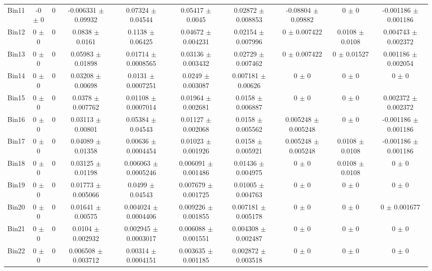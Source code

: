 \begin{tabular}{@{\extracolsep{4pt}}lccccccccc@{}}
     Bin11 & -0 $\pm$ 0 & 0 & -0.006331 $\pm$ 0.09932 & 0.07324 $\pm$ 0.04544 & 0.05417 $\pm$ 0.0045 & 0.02872 $\pm$ 0.008853 & -0.08804 $\pm$ 0.09882 & 0 $\pm$ 0 & -0.001186 $\pm$ 0.001186 \\ 
     Bin12 & 0 $\pm$ 0 & 0 & 0.0838 $\pm$ 0.0161 & 0.1138 $\pm$ 0.06425 & 0.04672 $\pm$ 0.004231 & 0.02154 $\pm$ 0.007996 & 0 $\pm$ 0.007422 & 0.0108 $\pm$ 0.0108 & 0.004743 $\pm$ 0.002372 \\ 
     Bin13 & 0 $\pm$ 0 & 0 & 0.05983 $\pm$ 0.01898 & 0.01714 $\pm$ 0.0008565 & 0.03136 $\pm$ 0.003432 & 0.02729 $\pm$ 0.007462 & 0 $\pm$ 0.007422 & 0 $\pm$ 0.01527 & 0.001186 $\pm$ 0.002054 \\ 
     Bin14 & 0 $\pm$ 0 & 0 & 0.03208 $\pm$ 0.00698 & 0.0131 $\pm$ 0.0007251 & 0.0249 $\pm$ 0.003087 & 0.007181 $\pm$ 0.00626 & 0 $\pm$ 0 & 0 $\pm$ 0 & 0 $\pm$ 0 \\ 
     Bin15 & 0 $\pm$ 0 & 0 & 0.0378 $\pm$ 0.007762 & 0.01108 $\pm$ 0.0007014 & 0.01964 $\pm$ 0.002681 & 0.0158 $\pm$ 0.006887 & 0 $\pm$ 0 & 0 $\pm$ 0 & 0.002372 $\pm$ 0.002372 \\ 
     Bin16 & 0 $\pm$ 0 & 0 & 0.03113 $\pm$ 0.00801 & 0.05384 $\pm$ 0.04543 & 0.01127 $\pm$ 0.002068 & 0.0158 $\pm$ 0.005562 & 0.005248 $\pm$ 0.005248 & 0 $\pm$ 0 & -0.001186 $\pm$ 0.001186 \\ 
     Bin17 & 0 $\pm$ 0 & 0 & 0.04089 $\pm$ 0.01358 & 0.00636 $\pm$ 0.0004454 & 0.01023 $\pm$ 0.001926 & 0.0158 $\pm$ 0.005921 & 0.005248 $\pm$ 0.005248 & 0.0108 $\pm$ 0.0108 & -0.001186 $\pm$ 0.001186 \\ 
     Bin18 & 0 $\pm$ 0 & 0 & 0.03125 $\pm$ 0.01198 & 0.006063 $\pm$ 0.0005246 & 0.006091 $\pm$ 0.001486 & 0.01436 $\pm$ 0.004975 & 0 $\pm$ 0 & 0.0108 $\pm$ 0.0108 & 0 $\pm$ 0 \\ 
     Bin19 & 0 $\pm$ 0 & 0 & 0.01773 $\pm$ 0.005066 & 0.0499 $\pm$ 0.04543 & 0.007679 $\pm$ 0.001725 & 0.01005 $\pm$ 0.004763 & 0 $\pm$ 0 & 0 $\pm$ 0 & 0 $\pm$ 0 \\ 
     Bin20 & 0 $\pm$ 0 & 0 & 0.01641 $\pm$ 0.00575 & 0.004024 $\pm$ 0.0004406 & 0.009226 $\pm$ 0.001855 & 0.007181 $\pm$ 0.005178 & 0 $\pm$ 0 & 0 $\pm$ 0 & 0 $\pm$ 0.001677 \\ 
     Bin21 & 0 $\pm$ 0 & 0 & 0.0104 $\pm$ 0.002932 & 0.002945 $\pm$ 0.0003017 & 0.006088 $\pm$ 0.001551 & 0.004308 $\pm$ 0.002487 & 0 $\pm$ 0 & 0 $\pm$ 0 & 0 $\pm$ 0 \\ 
     Bin22 & 0 $\pm$ 0 & 0 & 0.006508 $\pm$ 0.003712 & 0.00314 $\pm$ 0.0004151 & 0.003635 $\pm$ 0.001185 & 0.002872 $\pm$ 0.003518 & 0 $\pm$ 0 & 0 $\pm$ 0 & 0 $\pm$ 0 \\ 

\end{tabular}
